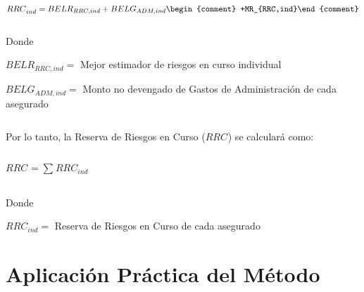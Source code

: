 \documentclass[11pt,twoside,openright,spanish]{report}
\numberwithin{equation}{chapter}
\numberwithin{figure}{chapter}
\numberwithin{table}{chapter}
\begin{document}
	{\centering
		${RRC}_{ind}^{}={{BELR}_{RRC,ind}+BELG_{ADM,ind} \begin{comment} +MR_{RRC,ind}\end{comment}
		}$
			
			
			
		\noindent
		
	}	
	
	
	\doublespacing

$ $

\doublespacing
	
	Donde
	
	\doublespacing
	
	$BELR_{RRC,ind}=$ Mejor estimador de riesgos en curso individual
	
	$BELG_{ADM,ind}^{}=$ Monto no devengado de Gastos de Administración de cada asegurado
	
	\begin{comment}
	$MR_{RRC,ind}^{}=$ Margen de Riesgo de la reserva de riesgos en curso calculado anteriormente
	\end{comment}
	
	\doublespacing

$ $

\doublespacing
	
	Por lo tanto, la Reserva de Riesgos en Curso ($RRC_{}$) se calculará como:
	
	\doublespacing

$ $

\doublespacing
	
	
	{\centering
		$RRC_{}={\sum _{}^{}RRC_{ind}^{}}$
		
		\noindent
		
	}	
	
	
	\doublespacing

$ $

\doublespacing
	
	Donde
	
	\doublespacing
	
		
	
	$RRC_{ind}^{}=$ Reserva de Riesgos en Curso de cada asegurado
	
	\chapter{Aplicación Práctica del Método}
	
	\doublespacing

$ $

\doublespacing

\clearpage
\appendix 
\end{document}
